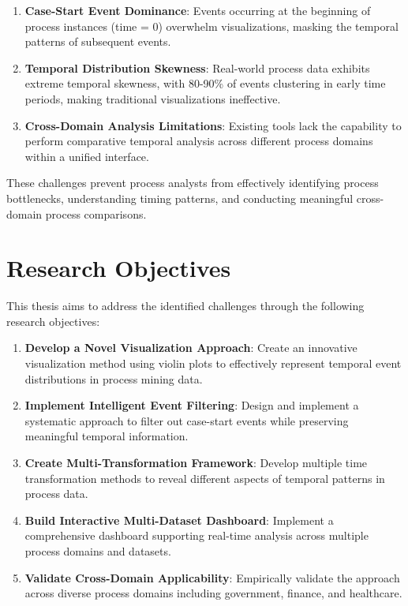 \begin{enumerate}
    \item \textbf{Case-Start Event Dominance}: Events occurring at the beginning of process instances (time = 0) overwhelm visualizations, masking the temporal patterns of subsequent events.
    
    \item \textbf{Temporal Distribution Skewness}: Real-world process data exhibits extreme temporal skewness, with 80-90\% of events clustering in early time periods, making traditional visualizations ineffective.
    
    \item \textbf{Cross-Domain Analysis Limitations}: Existing tools lack the capability to perform comparative temporal analysis across different process domains within a unified interface.
\end{enumerate}

These challenges prevent process analysts from effectively identifying process bottlenecks, understanding timing patterns, and conducting meaningful cross-domain process comparisons.

\section{Research Objectives}
\label{sec:research_objectives}

This thesis aims to address the identified challenges through the following research objectives:

\begin{enumerate}
    \item \textbf{Develop a Novel Visualization Approach}: Create an innovative visualization method using violin plots to effectively represent temporal event distributions in process mining data.
    
    \item \textbf{Implement Intelligent Event Filtering}: Design and implement a systematic approach to filter out case-start events while preserving meaningful temporal information.
    
    \item \textbf{Create Multi-Transformation Framework}: Develop multiple time transformation methods to reveal different aspects of temporal patterns in process data.
    
    \item \textbf{Build Interactive Multi-Dataset Dashboard}: Implement a comprehensive dashboard supporting real-time analysis across multiple process domains and datasets.
    
    \item \textbf{Validate Cross-Domain Applicability}: Empirically validate the approach across diverse process domains including government, finance, and healthcare.
\end{enumerate}

